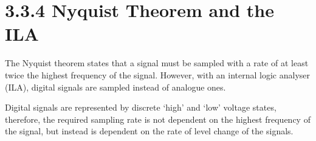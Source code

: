 \documentclass[11pt]{report}
\begin{document}
\section*{3.3.4 Nyquist Theorem and the ILA}
The Nyquist theorem states that a signal must be sampled with a rate of at least twice the highest frequency of the signal. However, with an internal logic analyser (ILA), digital signals are sampled instead of analogue ones.

Digital signals are represented by discrete `high’ and `low’ voltage states, therefore, the required sampling rate is not dependent on the highest frequency of the signal, but instead is dependent on the rate of level change of the signals.
\end{document}
